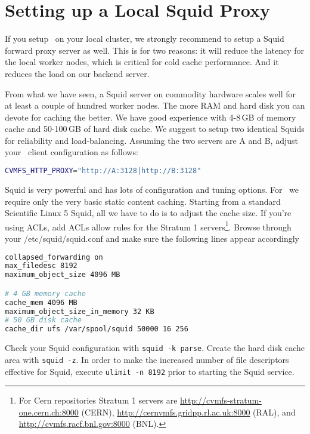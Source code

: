 \chapter{Setting up a Local Squid Proxy}
\label{sct:squid}

If you setup \cvmfs\ on your local cluster, we strongly recommend to setup a Squid forward proxy server as well.
This is for two reasons: it will reduce the latency for the local worker nodes, which is critical for cold cache performance. 
And it reduces the load on our backend server.

From what we have seen, a Squid server on commodity hardware scales well for at least a couple of hundred worker nodes.
The more RAM and hard disk you can devote for caching the better.
We have good experience with 4-8\,GB of memory cache and 50-100\,GB of hard disk cache.
We suggest to setup two identical Squids for reliability and load-balancing.
Assuming the two servers are A and B, adjust your \cvmfs\ client configuration as follows:
\begin{lstlisting}[language=bash]
CVMFS_HTTP_PROXY="http://A:3128|http://B:3128"
\end{lstlisting}

Squid is very powerful and has lots of configuration and tuning options.
For \cvmfs\ we require only the very basic static content caching.
Starting from a standard Scientific Linux 5 Squid, all we have to do is to adjust the cache size.
If you're using ACLs, add ACLs allow rules for the Stratum 1 servers\footnote{For Cern repositories Stratum 1 servers are \url{http://cvmfs-stratum-one.cern.ch:8000} (CERN), \url{http://cernvmfs.gridpp.rl.ac.uk:8000} (RAL), and \url{http://cvmfs.racf.bnl.gov:8000} (BNL).}.
Browse through your /etc/squid/squid.conf and make sure the following lines appear accordingly
\begin{lstlisting}[language=bash]
collapsed_forwarding on
max_filedesc 8192
maximum_object_size 4096 MB

# 4 GB memory cache
cache_mem 4096 MB
maximum_object_size_in_memory 32 KB
# 50 GB disk cache
cache_dir ufs /var/spool/squid 50000 16 256
\end{lstlisting}

Check your Squid configuration with \texttt{squid -k parse}.
Create the hard disk cache area with \texttt{squid -z}.
In order to make the increased number of file descriptors effective for Squid, execute \texttt{ulimit -n 8192} prior to starting the Squid service.
